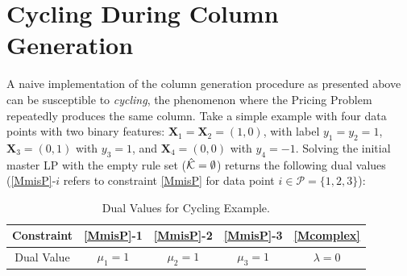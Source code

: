 \documentclass[twoside,11pt]{article}
\begin{document}
\section{Cycling During Column Generation} \label{app:cycling}
A naive implementation of the column generation procedure as presented above can be susceptible to \emph {cycling}, the phenomenon where the Pricing Problem repeatedly produces the same column. Take a simple example with four data points with two binary features: $\textbf{X}_1 = \textbf{X}_2 = (1,0)$, with label $y_1 = y_2 = 1$, $\textbf{X}_3 = (0,1)$ with $y_3 = 1$, and $\textbf{X}_4 = (0,0)$ with $y_4 = -1$. Solving the initial master LP with the empty rule set ($\hat{{\cal K}} = \emptyset$) returns the following dual values (\eqref{MmisP}-$i$ refers to constraint \eqref{MmisP} for data point $i \in \mathcal{P} = \{1,2,3\}$): %



\begin{table}[ht]
    \centering
    \begin{tabular}{c||c|c|c|c}
         Constraint & \eqref{MmisP}-1 & \eqref{MmisP}-2 & \eqref{MmisP}-3 &  \eqref{Mcomplex}  \\ \midrule
         Dual Value & $\mu_1 =1$ & $\mu_2 =1$ & $\mu_3 =1$ & $ \lambda =0$ 
    \end{tabular}
    \caption{Dual Values for Cycling Example. }
    \label{tab:toy_ex}
\end{table}
\end{document}

